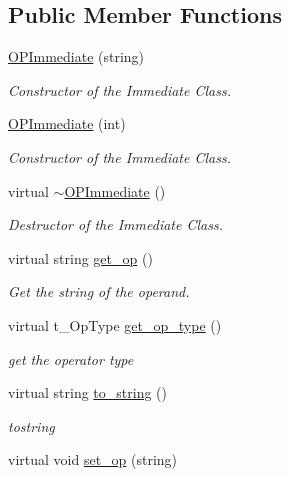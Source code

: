 \subsection*{\-Public \-Member \-Functions}
\begin{DoxyCompactItemize}
\item 
\hypertarget{classOPImmediate_ab047dac5f3390947a21e4ab118c05857}{\hyperlink{classOPImmediate_ab047dac5f3390947a21e4ab118c05857}{\-O\-P\-Immediate} (string)}\label{classOPImmediate_ab047dac5f3390947a21e4ab118c05857}

\begin{DoxyCompactList}\small\item\em \-Constructor of the \-Immediate \-Class. \end{DoxyCompactList}\item 
\hypertarget{classOPImmediate_ae940dcf9e9050227a94c759a0cae6861}{\hyperlink{classOPImmediate_ae940dcf9e9050227a94c759a0cae6861}{\-O\-P\-Immediate} (int)}\label{classOPImmediate_ae940dcf9e9050227a94c759a0cae6861}

\begin{DoxyCompactList}\small\item\em \-Constructor of the \-Immediate \-Class. \end{DoxyCompactList}\item 
\hypertarget{classOPImmediate_af7f51ae61e075e02817d6ecd7441408f}{virtual \hyperlink{classOPImmediate_af7f51ae61e075e02817d6ecd7441408f}{$\sim$\-O\-P\-Immediate} ()}\label{classOPImmediate_af7f51ae61e075e02817d6ecd7441408f}

\begin{DoxyCompactList}\small\item\em \-Destructor of the \-Immediate \-Class. \end{DoxyCompactList}\item 
virtual string \hyperlink{classOPImmediate_ad714fb614c0d8f4afa1157a34b2936fd}{get\-\_\-op} ()
\begin{DoxyCompactList}\small\item\em \-Get the string of the operand. \end{DoxyCompactList}\item 
virtual t\-\_\-\-Op\-Type \hyperlink{classOPImmediate_aed01353798ae57936a9f77dd05eafa88}{get\-\_\-op\-\_\-type} ()
\begin{DoxyCompactList}\small\item\em get the operator type \end{DoxyCompactList}\item 
virtual string \hyperlink{classOPImmediate_a12bc613de3bff73ead8632dafd8050a0}{to\-\_\-string} ()
\begin{DoxyCompactList}\small\item\em tostring \end{DoxyCompactList}\item 
\hypertarget{classOPImmediate_ae5d6c30c6bff17de4e7fabb24cf6bf59}{virtual void \hyperlink{classOPImmediate_ae5d6c30c6bff17de4e7fabb24cf6bf59}{set\-\_\-op} (string)}\label{classOPImmediate_ae5d6c30c6bff17de4e7fabb24cf6bf59}


\end{DoxyCompactItemize}
